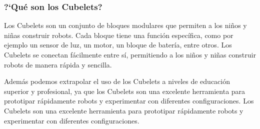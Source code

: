 \subsubsection{?`Qu\'e son los Cubelets?}
\label{subsubsection:queSonCubelets}
    Los Cubelets son un conjunto de bloques modulares que permiten a los ni\~nos y ni\~nas
        construir robots. Cada bloque tiene una funci\'on espec\'ifica, como por ejemplo
        un sensor de luz, un motor, un bloque de bater\'ia, entre otros. Los Cubelets
        se conectan f\'acilmente entre s\'i, permitiendo a los ni\~nos y ni\~nas
        construir robots de manera r\'apida y sencilla.
        
    \vskip 0.5cm
    Adem\'as podemos extrapolar el uso de los Cubelets a niveles de educaci\'on superior y
        profesional, ya que los Cubelets son una excelente herramienta para prototipar
        r\'apidamente robots y experimentar con diferentes configuraciones. Los Cubelets
        son una excelente herramienta para prototipar r\'apidamente robots y experimentar
        con diferentes configuraciones.
    